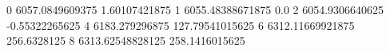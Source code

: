 0 6057.0849609375 1.60107421875
1 6055.48388671875 0.0
2 6054.9306640625 -0.55322265625
4 6183.279296875 127.79541015625
6 6312.11669921875 256.6328125
8 6313.62548828125 258.1416015625
